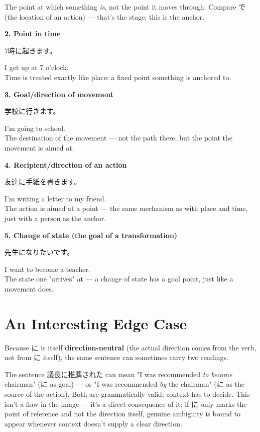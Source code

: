 \documentclass[12pt]{book}
\begin{document}
The point at which something \emph{is}, not the point it moves through. Compare で (the location of an action) — that's the stage; this is the anchor.

\textbf{2. Point in time}
\par\quad 7時に起きます。\\
\par\quad I get up at 7 o'clock.\\

Time is treated exactly like place: a fixed point something is anchored to.

\textbf{3. Goal/direction of movement}
\par\quad 学校に行きます。\\
\par\quad I'm going to school.\\

The destination of the movement — not the path there, but the point the movement is aimed at.

\textbf{4. Recipient/direction of an action}
\par\quad 友達に手紙を書きます。\\
\par\quad I'm writing a letter to my friend.\\

The action is aimed at a point — the same mechanism as with place and time, just with a person as the anchor.

\textbf{5. Change of state (the goal of a transformation)}
\par\quad 先生になりたいです。\\
\par\quad I want to become a teacher.\\

The state one "arrives" at — a change of state has a goal point, just like a movement does.

\section*{An Interesting Edge Case}

Because に is itself \textbf{direction-neutral} (the actual direction comes from the verb, not from に itself), the same sentence can sometimes carry two readings.

The sentence 議長に推薦された can mean "I was recommended \emph{to become} chairman" (に as goal) — or "I was recommended \emph{by} the chairman" (に as the source of the action). Both are grammatically valid; context has to decide. This isn't a flaw in the image — it's a direct consequence of it: if に only marks the point of reference and not the direction itself, genuine ambiguity is bound to appear whenever context doesn't supply a clear direction.
\end{document}
